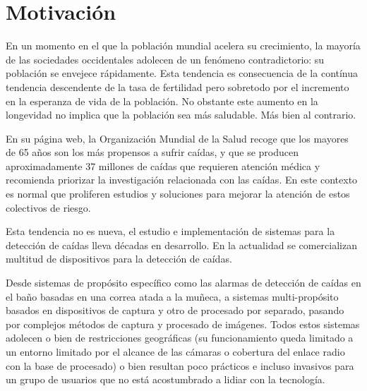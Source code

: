 %

\begin{comment}
Resumen esquemático de cada una de las partes del trabajo. Leer esta sección ha de dar una idea clara de lo que se pretendía y las concluseiones a las que se han llegado y del proceso seguido. Es uno de los capítulos mas importantes
\end{comment}

\section{Motivación}

\begin{comment}
Problema a tratar, posiles causas, relevancia del problema
\end{comment}

En un momento en el que la población mundial acelera su crecimiento, la mayoría de las sociedades occidentales adolecen de un fenómeno contradictorio: su población se envejece rápidamente. Esta tendencia es consecuencia de la contínua tendencia descendente de la tasa de fertilidad pero sobretodo por el incremento en la esperanza de vida de la población. No obstante este aumento en la longevidad no implica que la población sea más saludable. Más bien al contrario.

En su página web, la Organización Mundial de la Salud recoge que los mayores de 65 años son los más propensos a sufrir caídas, y que se producen aproximadamente 37 millones de caídas que requieren atención médica y recomienda priorizar la investigación relacionada con las caídas\cite{FactsFalls2018}. En este contexto es normal que proliferen estudios y soluciones para mejorar la atención de estos colectivos de riesgo.

Esta tendencia no es nueva, el estudio e implementación de sistemas para la detección de caídas lleva décadas en desarrollo\cite{fallindex00, Chen2005, Noury2007, Bourke2006}. En la actualidad se comercializan multitud de dispositivos para la detección de caídas.

Desde sistemas de propósito específico como las alarmas de detección de caídas en el baño basadas en una correa atada a la muñeca, a sistemas multi-propósito basados en dispositivos de captura y otro de procesado por separado, pasando por complejos métodos de captura y procesado de imágenes. Todos estos sistemas adolecen o bien de restricciones geográficas (su funcionamiento queda limitado a un entorno limitado por el alcance de las cámaras o cobertura del enlace radio con la base de procesado) o bien resultan poco prácticos e incluso invasivos para un grupo de usuarios que no está acostumbrado a lidiar con la tecnología.

